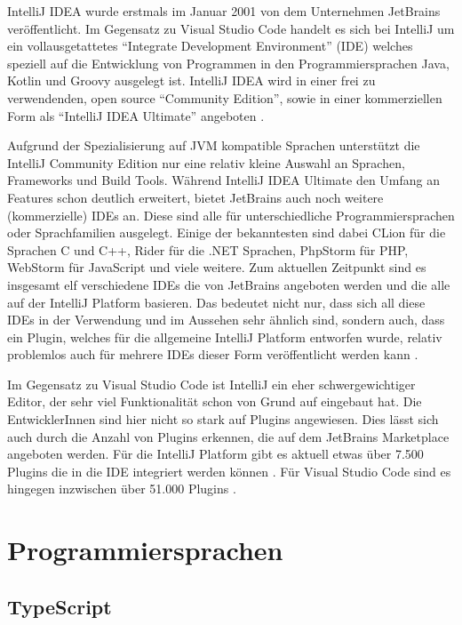 IntelliJ IDEA wurde erstmals im Januar 2001 \cite{IntelliJIDEAWikipedia,IntelliJReleasePage}
von dem Unternehmen 
JetBrains veröffentlicht. Im Gegensatz zu Visual Studio Code handelt 
es sich bei IntelliJ um ein vollausgetattetes
\enquote{Integrate Development Environment}
(IDE) welches speziell auf die Entwicklung 
von Programmen in den Programmiersprachen Java, Kotlin und Groovy ausgelegt ist. 
IntelliJ IDEA wird in einer frei zu verwendenden, open source 
\enquote{Community Edition}, sowie in einer kommerziellen Form als 
\enquote{IntelliJ IDEA Ultimate} angeboten \cite{HagosTed2022BII:}. 

Aufgrund der Spezialisierung auf JVM kompatible Sprachen unterstützt 
die IntelliJ Community Edition nur eine relativ kleine Auswahl an 
Sprachen, Frameworks und Build Tools. Während IntelliJ IDEA Ultimate 
den Umfang an Features schon deutlich erweitert, bietet JetBrains auch 
noch weitere (kommerzielle) IDEs an. Diese sind alle für unterschiedliche 
Programmiersprachen oder Sprachfamilien ausgelegt. Einige der bekanntesten 
sind dabei CLion für die Sprachen C und C++, Rider für die .NET Sprachen, 
PhpStorm für PHP, WebStorm für JavaScript und viele weitere. Zum aktuellen 
Zeitpunkt sind es insgesamt elf verschiedene IDEs die von JetBrains 
angeboten werden und die alle auf der IntelliJ Platform basieren. Das 
bedeutet nicht nur, dass sich all diese IDEs in der Verwendung und im 
Aussehen sehr ähnlich sind, sondern auch, dass ein Plugin, welches für 
die allgemeine IntelliJ Platform entworfen wurde, relativ problemlos 
auch für mehrere IDEs dieser Form veröffentlicht werden kann \cite{IntelliJSDKDocumentation}.

Im Gegensatz zu Visual Studio Code ist IntelliJ ein eher schwergewichtiger
Editor, der sehr viel Funktionalität schon von Grund auf eingebaut 
hat. Die EntwicklerInnen sind hier nicht so stark auf Plugins angewiesen.
Dies lässt sich auch durch die Anzahl von Plugins erkennen, die auf dem 
JetBrains Marketplace angeboten werden. Für die IntelliJ Platform gibt 
es aktuell etwas über 7.500 Plugins die in die IDE integriert werden können 
\cite{IntelliJMarketplace}.
Für Visual Studio Code sind es hingegen inzwischen über 51.000 Plugins
\cite{VSCodeMarketplace}.


\section{Programmiersprachen}
\label{sec:Programmiersprachen}

\subsection{TypeScript}

